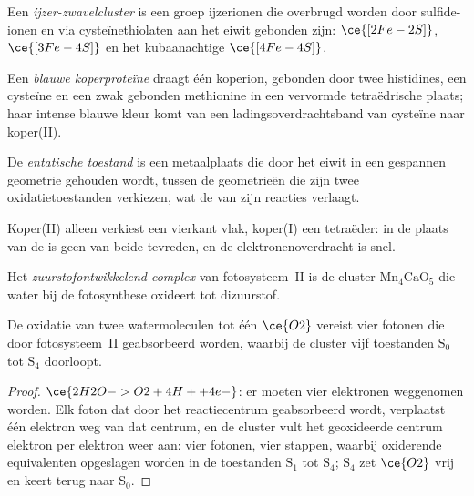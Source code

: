 \begin{definition}\label{def:b3:bioinorganic:fes}
Een \emph{ijzer-zwavelcluster} is een groep
ijzerionen die overbrugd worden door sulfide-ionen en via
cysteïnethiolaten aan het eiwit gebonden zijn:
$\ce{[2Fe-2S]}$, $\ce{[3Fe-4S]}$ en het kubaanachtige $\ce{[4Fe-4S]}$.
\end{definition}

\begin{definition}\label{def:b3:bioinorganic:blue-copper}
Een \emph{blauwe koperproteïne}
draagt één koperion, gebonden door twee histidines, een cysteïne en een
zwak gebonden methionine in een vervormde tetraëdrische plaats; haar
intense blauwe kleur komt van een ladingsoverdrachtsband van cysteïne
naar koper(II).
\end{definition}

\begin{definition}\label{def:b3:bioinorganic:entatic}
De \emph{entatische toestand} is een
metaalplaats die door het eiwit in een gespannen geometrie gehouden
wordt, tussen de geometrieën die zijn twee oxidatietoestanden verkiezen,
wat de  van zijn reacties verlaagt.
\end{definition}

Koper(II) alleen verkiest een vierkant vlak, koper(I) een tetraëder: in de
plaats van de  is geen van beide tevreden, en de
elektronenoverdracht is snel.

\begin{definition}\label{def:b3:bioinorganic:oec}
Het \emph{zuurstofontwikkelend complex}
van fotosysteem~II is de cluster $\mathrm{Mn_4CaO_5}$ die water bij de fotosynthese oxideert tot
dizuurstof.
\end{definition}

\begin{proposition}\label{prop:b3:bioinorganic:kok}
De oxidatie van twee watermoleculen tot één $\ce{O2}$ vereist vier fotonen
die door fotosysteem~II geabsorbeerd worden, waarbij de cluster vijf toestanden $\mathrm S_0$ tot $\mathrm S_4$ doorloopt.
\end{proposition}

\begin{proof}
$\ce{2H2O -> O2 + 4H+ + 4e-}$: er moeten vier elektronen weggenomen worden. Elk foton dat door het
reactiecentrum geabsorbeerd wordt, verplaatst één elektron weg van dat
centrum, en de cluster vult het geoxideerde centrum elektron per
elektron weer aan: vier fotonen, vier stappen, waarbij oxiderende
equivalenten opgeslagen worden in de toestanden $\mathrm S_1$ tot $\mathrm S_4$; $\mathrm S_4$ zet $\ce{O2}$ vrij en keert terug naar $\mathrm S_0$.
\end{proof}


